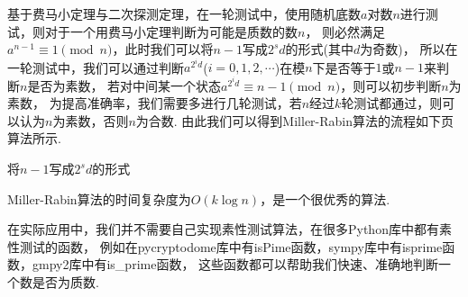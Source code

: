 \documentclass{book}
\numberwithin{equation}{subsubsection}
\begin{document}
基于费马小定理与二次探测定理，在一轮测试中，使用随机底数$a$对数$n$进行测试，则对于一个用费马小定理判断为可能是质数的数$n$，
则必然满足$a^{n-1}\equiv 1\pmod{n}$，此时我们可以将$n-1$写成$2^sd$的形式(其中$d$为奇数)，
所以在一轮测试中，我们可以通过判断$a^{2^{i}d}$($i=0,1,2,\cdots $)在模$n$下是否等于$1$或$n-1$来判断$n$是否为素数，
若对中间某一个状态$a^{2^{i}d}\equiv n-1\pmod{n}$，则可以初步判断$n$为素数，
为提高准确率，我们需要多进行几轮测试，若$n$经过$k$轮测试都通过，则可以认为$n$为素数，否则$n$为合数.
由此我们可以得到Miller-Rabin算法的流程如下页算法所示.
\begin{algorithm}[ht!]
    \caption{Miller-Rabin素性测试$\text{MillerRabin}(n,k)$}
    将$n-1$写成$2^sd$的形式\\
\end{algorithm}\par
Miller-Rabin算法的时间复杂度为$O(k\log{n})$，是一个很优秀的算法.\par
在实际应用中，我们并不需要自己实现素性测试算法，在很多Python库中都有素性测试的函数，
例如在pycryptodome库中有isPime函数，sympy库中有isprime函数，gmpy2库中有is\_prime函数，
这些函数都可以帮助我们快速、准确地判断一个数是否为质数.
\end{document}
